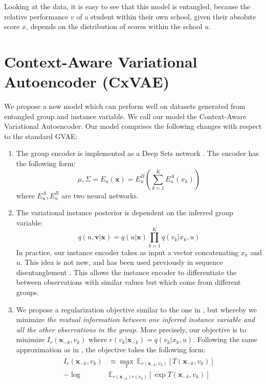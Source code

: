 \documentclass[nohyperref]{article}
\theoremstyle{plain}
\theoremstyle{definition}
\theoremstyle{remark}
\begin{document}
Looking at the data, it is easy to see that this model is entangled, because the relative performance $v$ of a student within their own school, given their absolute score $x$, depends on the distribution of scores within the school $u$.

\section{Context-Aware Variational Autoencoder (CxVAE)}

We propose a new model which can perform well on datasets generated from entangled group and instance variable. We call our model the Context-Aware Variational Autoencoder. Our model comprises the following changes with respect to the standard GVAE:

\begin{enumerate}
    \item The group encoder is implemented as a Deep Sets network \citep{Zaheer2017DeepS}. The encoder has the following form:
    $$\mu, \Sigma = E_u (\mathbf{x}) = E^B_u \left( \sum_{k=1}^K E^A_u (x_k)\right)$$
    where $E^A_u, E^B_u$ are two neural networks.
    \item The variational instance posterior is dependent on the inferred group variable:
    $$q(u, \mathbf{v} | \mathbf{x}) = q(u | \mathbf{x}) \prod_{k=1}^K q(v_k | x_k, u)$$
    In practice, our instance encoder takes as input a vector concatenating $x_k$ and $u$. This idea is not new, and has been used previously in sequence disentanglement \citep{Li2018DisentangledSA}. This allows the instance encoder to differentiate the between observations with similar values but which come from different groups.
    \item We propose a regularization objective similar to the one in \citet{Nmeth2020AdversarialDW}, but whereby we minimize \textit{the mutual information between one inferred instance variable and all the other observations in the group}. More precisely, our objective is to minimize $I_r (\mathbf{x}_{-k}, v_k)$ where $r(v_k | \mathbf{x}_{-k}) = q(v_k | x_k, u)$. Following the same approximation as in \citet{Nmeth2020AdversarialDW}, the objective takes the following form:
    \begin{align}
        \begin{split}
            I_{r} (\mathbf{x}_{-k}, v_k) &\approx \max_{T} ~ \mathbb{E}_{r(\mathbf{x}_{-k}, v_k)} [T(\mathbf{x}_{-k}, v_k)] \\ - \log &\mathbb{E}_{r(\mathbf{x}_{-k}) r(v_k)} [\exp T(\mathbf{x}_{-k}, v_k)]

\end{split}
\end{align}
\end{enumerate}
\end{document}
